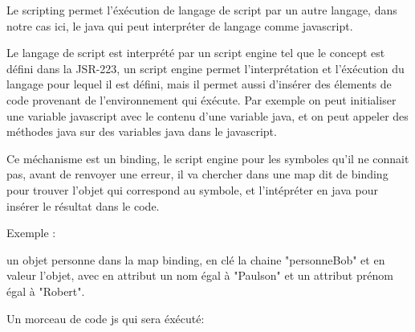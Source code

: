 Le scripting permet l'éxécution de langage de script par un autre langage, dans
notre cas ici, le java qui peut interpréter de langage comme javascript.

Le langage de script est interprété par un script engine tel que le concept est 
défini dans la JSR-223, un script engine permet l'interprétation et l'éxécution
du langage pour lequel il est défini, mais il permet aussi d'insérer des élements
de code provenant de l'environnement qui éxécute. Par exemple on peut initialiser
une variable javascript avec le contenu d'une variable java, et on peut appeler 
des méthodes java sur des variables java dans le javascript.

Ce méchanisme est un binding, le script engine pour les symboles qu'il ne connait
pas, avant de renvoyer une erreur, il va chercher dans une map dit de binding 
pour trouver l'objet qui correspond au symbole, et l'intépréter en java pour
insérer le résultat dans le code.

Exemple :

un objet personne dans la map binding, en clé la chaine "personneBob" et en valeur 
l'objet, avec en attribut un nom égal à "Paulson" et un attribut prénom égal à
"Robert".

Un morceau de code js qui sera éxécuté:


